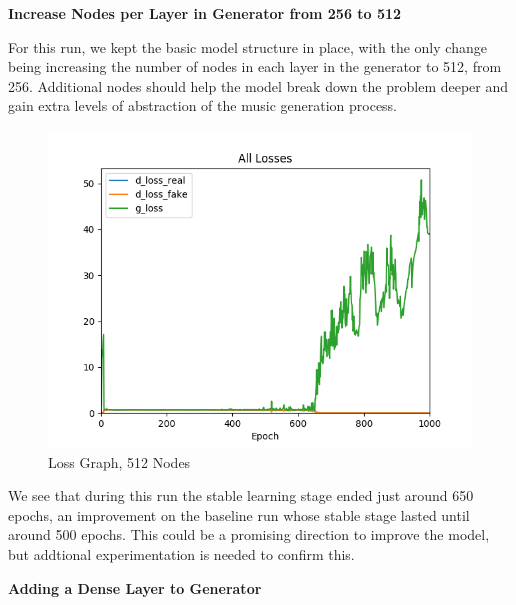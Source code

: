 \documentclass[12pt,oneside]{chicagocapstone}
\begin{document}
\textbf{Increase Nodes per Layer in Generator from 256 to 512}

For this run, we kept the basic model structure in place, with the only change being increasing the number of nodes in each layer in the generator to 512, from 256. Additional nodes should help the model break down the problem deeper and gain extra levels of abstraction of the music generation process.
\begin{figure}

{\centering \includegraphics[width=0.8\linewidth]{figure/ap_512} 

}

\caption{Loss Graph, 512 Nodes}\label{fig:unnamed-chunk-10}
\end{figure}
We see that during this run the stable learning stage ended just around 650 epochs, an improvement on the baseline run whose stable stage lasted until around 500 epochs. This could be a promising direction to improve the model, but addtional experimentation is needed to confirm this.

\textbf{Adding a Dense Layer to Generator}
\end{document}
